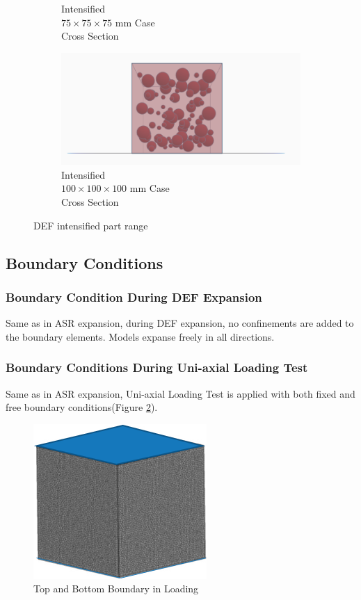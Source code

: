 \begin{figure}[ht]
\begin{subfigure}{.33\textwidth}
      \caption{Intensified \\  $75 \times 75 \times 75$ mm Case \\ Cross Section}
    \end{subfigure}%
    \begin{subfigure}{.33\textwidth}
      \centering
      \includegraphics[width=.9\linewidth]{Files/DEF_X/X-1_3ds.png}
      \caption{Intensified  \\ $100 \times 100 \times 100$ mm Case\\ Cross Section}
    \end{subfigure}
  \caption{DEF intensified part range}
  \label{fig:DEFffff_X}
\end{figure}

\subsection{Boundary Conditions}

\subsubsection{Boundary Condition During DEF Expansion}

Same as in ASR expansion, during DEF expansion, no confinements are added to the boundary elements. Models expanse freely in all directions.

\subsubsection{Boundary Conditions During Uni-axial Loading Test}

Same as in ASR expansion, Uni-axial Loading Test is applied with both fixed and free boundary conditions(Figure \ref{boundaaary}).

\begin{figure}[h!]
  \centering
  \includegraphics{Files/Background/LOAD.png}
  \caption{Top and Bottom Boundary in Loading}
  \label{boundaaary}
\end{figure}

